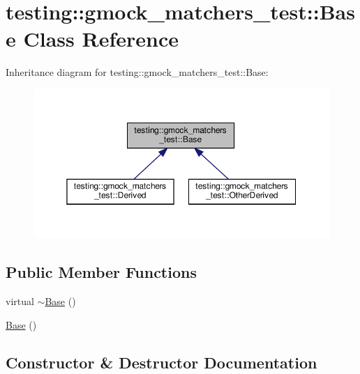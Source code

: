 \hypertarget{classtesting_1_1gmock__matchers__test_1_1_base}{}\section{testing\+:\+:gmock\+\_\+matchers\+\_\+test\+:\+:Base Class Reference}
\label{classtesting_1_1gmock__matchers__test_1_1_base}


Inheritance diagram for testing\+:\+:gmock\+\_\+matchers\+\_\+test\+:\+:Base\+:
\nopagebreak
\begin{figure}[H]
\begin{center}
\leavevmode
\includegraphics[width=350pt]{classtesting_1_1gmock__matchers__test_1_1_base__inherit__graph}
\end{center}
\end{figure}
\subsection*{Public Member Functions}
\begin{DoxyCompactItemize}
\item 
virtual \hyperlink{classtesting_1_1gmock__matchers__test_1_1_base_ab02c73411d19b28ccb847c65bc782bb6}{$\sim$\+Base} ()
\item 
\hyperlink{classtesting_1_1gmock__matchers__test_1_1_base_ab3b2127992b81455804462897de44516}{Base} ()
\end{DoxyCompactItemize}


\subsection{Constructor \& Destructor Documentation}
\mbox{\label{classtesting_1_1gmock__matchers__test_1_1_base_ab02c73411d19b28ccb847c65bc782bb6}} 
